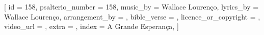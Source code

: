 
[
    id                     = {158},
    psalterio_number       = {158},
    music_by               = {Wallace Lourenço},
    lyrics_by              = {Wallace Lourenço},
    arrangement_by         = {},
    bible_verse            = {},
    licence_or_copyright   = {},
    video_url              = {},
    extra                  = {},
    index                  = {A Grande Esperança},
]



\beginverse

